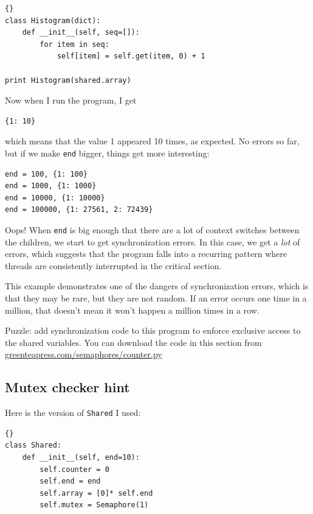 \documentclass{book}
\newcommand{\clearemptydoublepage}{\newpage\cleardoublepage}
\begin{document}
\begin{latin}
\begin{lstlisting}[title={}]{}
class Histogram(dict):
    def __init__(self, seq=[]):
        for item in seq:
            self[item] = self.get(item, 0) + 1

print Histogram(shared.array)
\end{lstlisting}
\end{latin}

Now when I run the program, I get

\begin{verbatim}
{1: 10}
\end{verbatim}
%
which means that the value 1 appeared 10 times, as expected.  No
errors so far, but if we make {\tt end} bigger, things get more
interesting:

\begin{verbatim}
end = 100, {1: 100}
end = 1000, {1: 1000}
end = 10000, {1: 10000}
end = 100000, {1: 27561, 2: 72439}
\end{verbatim}
%
Oops!  When {\tt end} is big enough that there are a lot of
context switches between the children, we start to get synchronization
errors.  In this case, we get a {\em lot} of errors, which suggests
that the program falls into a recurring pattern where threads are 
consistently interrupted in the critical section.

This example demonstrates one of the dangers of synchronization
errors, which is that they may be rare, but they are not random.
If an error occurs one time in a million, that doesn't mean it
won't happen a million times in a row.

Puzzle: add synchronization code to this program to enforce
exclusive access to the shared variables.  You can download the
code in this section from \url{greenteapress.com/semaphores/counter.py}


\clearemptydoublepage
\subsection {Mutex checker hint}

Here is the version of {\tt Shared} I used:

\begin{latin}
\begin{lstlisting}[title={}]{}
class Shared:
    def __init__(self, end=10):
        self.counter = 0
        self.end = end
        self.array = [0]* self.end
        self.mutex = Semaphore(1)
\end{lstlisting}
\end{latin}
\end{document}
